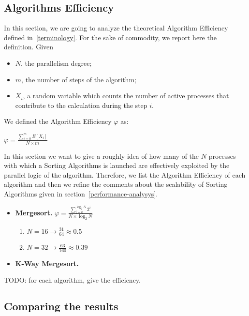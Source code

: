 

\subsection{Algorithms Efficiency}
In this section, we are going to analyze the theoretical Algorithm Efficiency defined in~\ref{terminology}. For the sake of commodity, we report here the definition. Given
\begin{itemize}
\item $N$, the parallelism degree; 
\item $m$, the number of steps of the algorithm;
\item $X_i$, a random variable which counts the number of active processes that contribute to the calculation during the step $i$.
\end{itemize}
We defined the Algorithm Efficiency $\varphi$ as:
\begin{center}
$\varphi = \frac{\sum_{i=0}^m E[X_i]}{N \times m} $
\end{center}
In this section we want to give a roughly idea of how many of the $N$ processes with which a  Sorting Algorithms is launched are effectively exploited by the parallel logic of the algorithm. Therefore, we list the Algorithm Efficiency of each algorithm and then we refine the comments about the scalability of Sorting Algorithms given in section~\ref{performance-analysys}.

\begin{itemize}
\item \textbf{Mergesort.} 
$\varphi = \frac{\sum_{i=0}^{\log_2{N}} 2^i}{N \times \log_2{N}} $
\begin{enumerate}
\item $N = 16 \rightarrow \frac{31}{64} \approx 0.5$
\item $N = 32 \rightarrow \frac{63}{160} \approx 0.39$
\end{enumerate}

\item \textbf{K-Way Mergesort.}

\end{itemize}

TODO: for each algorithm, give the efficiency.

\subsection{Comparing the results}